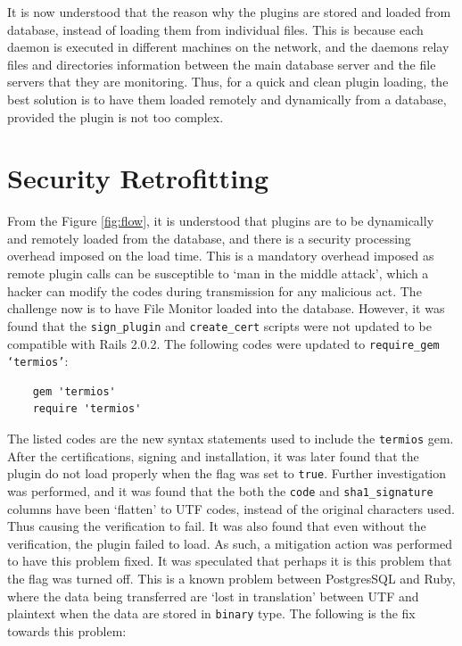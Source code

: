 \documentclass{article}
\begin{document}
It is now understood that the reason why the plugins are stored and loaded from database, instead of loading them from individual files. This is because each daemon is executed in different machines on the network, and the daemons relay files and directories information between the main database server and the file servers that they are monitoring. Thus, for a quick and clean plugin loading, the best solution is to have them loaded remotely and dynamically from a database, provided the plugin is not too complex. 


\section{Security Retrofitting} %
\label{sec:security_retrofitting}

From the Figure \ref{fig:flow}, it is understood that plugins are to be dynamically and remotely loaded from the database, and there is a security processing overhead imposed on the load time. This is a mandatory overhead imposed as remote plugin calls can be susceptible to `man in the middle attack', which a hacker can modify the codes during transmission for any malicious act. The challenge now is to have File Monitor loaded into the database. However, it was found that the \texttt{sign\_plugin} and \texttt{create\_cert} scripts were not updated to be compatible with Rails 2.0.2. The following codes were updated to \texttt{require\_gem `termios'}: 

\begin{verbatim}
    gem 'termios'
    require 'termios'
\end{verbatim}

The listed codes are the new syntax statements used to include the \texttt{termios} gem. After the certifications, signing and installation, it was later found that the plugin do not load properly when the flag was set to \texttt{true}. Further investigation was performed, and it was found that the both the \texttt{code} and \texttt{sha1\_signature} columns have been `flatten' to UTF codes, instead of the original characters used. Thus causing the verification to fail. It was also found that even without the verification, the plugin failed to load. As such, a mitigation action was performed to have this problem fixed. It was speculated that perhaps it is this problem that the flag was turned off. This is a known problem between PostgresSQL and Ruby, where the data being transferred are `lost in translation' between UTF and plaintext when the data are stored in \texttt{binary} type. The following is the fix towards this problem:
\end{document}
